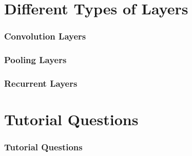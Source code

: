 \documentclass[aspectratio=169, 10pt]{beamer}
\begin{document}
\section{Different Types of Layers}
\begin{frame}
    \frametitle{Convolution Layers}
        
\end{frame}

\begin{frame}
    \frametitle{Pooling Layers}
        
\end{frame}

\begin{frame}
    \frametitle{Recurrent Layers}
        
\end{frame}

\section{Tutorial Questions}
\begin{frame}
    \frametitle{Tutorial Questions}
        
\end{frame}
\end{document}
